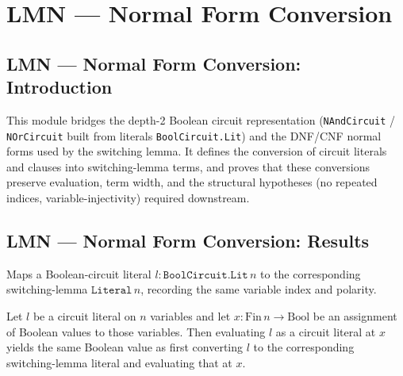 \section{LMN --- Normal Form Conversion}
\subsection*{LMN --- Normal Form Conversion: Introduction}

This module bridges the depth-2 Boolean circuit representation
(\texttt{NAndCircuit} / \texttt{NOrCircuit} built from literals \texttt{BoolCircuit.Lit})
and the DNF/CNF normal forms used by the switching lemma. It defines the
conversion of circuit literals and clauses into switching-lemma terms, and proves
that these conversions preserve evaluation, term width, and the structural
hypotheses (no repeated indices, variable-injectivity) required downstream.

\subsection*{LMN --- Normal Form Conversion: Results}

\begin{definition}
\label{BoolCircuit.Lit.toLiteral}
\leanok
{}
Maps a Boolean-circuit literal $l : \texttt{BoolCircuit.Lit}\,n$ to the corresponding
switching-lemma $\texttt{Literal}\,n$, recording the same variable index and polarity.
\end{definition}

\begin{theorem}
\label{BoolCircuit.Lit.eval_eq_toLiteral_eval}
\leanok
{}
Let $l$ be a circuit literal on $n$ variables and let $x : \mathrm{Fin}\,n \to
\mathrm{Bool}$ be an assignment of Boolean values to those variables. Then evaluating
$l$ as a circuit literal at $x$ yields the same Boolean value as first converting $l$ to
the corresponding switching-lemma literal and evaluating that at $x$.
\end{theorem}

